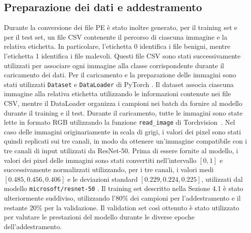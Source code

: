 \subsection{Preparazione dei dati e addestramento}

Durante la conversione dei file PE è stato inoltre generato, per il
training set e per il test set, un file CSV contenente il percorso
di ciascuna immagine e la relativa etichetta. In particolare,
l'etichetta 0 identifica i file benigni, mentre l'etichetta 1
identifica i file malevoli.
Questi file CSV sono stati successivamente utilizzati per associare
ogni immagine alla classe corrispondente durante il caricamento dei
dati.
Per il caricamento e la preparazione delle immagini sono stati
utilizzati \texttt{Dataset} e \texttt{DataLoader} di PyTorch
\cite{pytorch}. Il dataset associa ciascuna immagine alla relativa
etichetta utilizzando le informazioni contenute nei file CSV, mentre
il DataLoader organizza i campioni nei batch da fornire al modello
durante il training e il test.
Durante il caricamento, tutte le immagini sono state lette in formato RGB
utilizzando la funzione \texttt{read\_image} di Torchvision~\cite{torchvision}. 
Nel caso delle immagini originariamente in scala di grigi, i
valori dei pixel sono stati quindi replicati sui tre canali, in modo
da ottenere un'immagine compatibile con i tre canali di input utilizzati
da ResNet-50.
Prima di essere fornite al modello, i valori dei pixel delle immagini sono stati
convertiti nell'intervallo $[0,1]$ e successivamente normalizzati
utilizzando, per i tre canali, i valori medi
$[0.485, 0.456, 0.406]$ e le deviazioni standard
$[0.229, 0.224, 0.225]$, utilizzati dal modello
\texttt{microsoft/resnet-50} \cite{huggingface_resnet50_preprocessor}.
Il training set descritto nella Sezione 4.1 è stato ulteriormente
suddiviso, utilizzando l'80\% dei campioni per l'addestramento e il
restante 20\% per la validazione. Il validation set così ottenuto è stato utilizzato
per valutare le prestazioni del modello durante le diverse epoche dell'addestramento.

